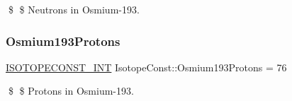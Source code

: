 \$ \$ Neutrons in Osmium-\/193. \mbox{\label{group___isotope_const-_osmium-_os193_ga3396de6fa3a80d80ea75b9d761cbe62d}} 
\subsubsection{\texorpdfstring{Osmium193\+Protons}{Osmium193Protons}}
{\footnotesize\ttfamily \mbox{\hyperlink{group___isotope_const-_macros_ga5f18360b3e99483a35c32d789e62621c}{I\+S\+O\+T\+O\+P\+E\+C\+O\+N\+S\+T\+\_\+\+I\+NT}} Isotope\+Const\+::\+Osmium193\+Protons = 76}

\$ \$ Protons in Osmium-\/193. 